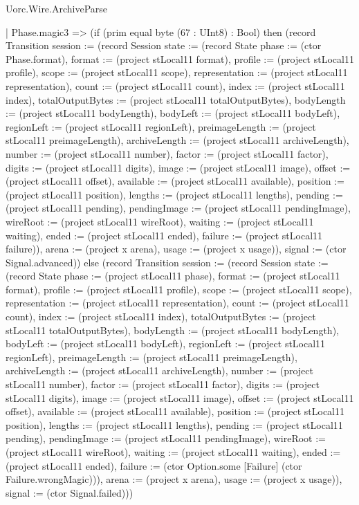 \begin{lexlean}{Uorc.Wire.ArchiveParse}
\begin{semanticmodule}
{    | Phase.magic3 => (if (prim equal byte (67 : UInt8) : Bool) then (record Transition {session := (record Session {state := (record State {phase := (ctor Phase.format), format := (project stLocal11 format), profile := (project stLocal11 profile), scope := (project stLocal11 scope), representation := (project stLocal11 representation), count := (project stLocal11 count), index := (project stLocal11 index), totalOutputBytes := (project stLocal11 totalOutputBytes), bodyLength := (project stLocal11 bodyLength), bodyLeft := (project stLocal11 bodyLeft), regionLeft := (project stLocal11 regionLeft), preimageLength := (project stLocal11 preimageLength), archiveLength := (project stLocal11 archiveLength), number := (project stLocal11 number), factor := (project stLocal11 factor), digits := (project stLocal11 digits), image := (project stLocal11 image), offset := (project stLocal11 offset), available := (project stLocal11 available), position := (project stLocal11 position), lengths := (project stLocal11 lengths), pending := (project stLocal11 pending), pendingImage := (project stLocal11 pendingImage), wireRoot := (project stLocal11 wireRoot), waiting := (project stLocal11 waiting), ended := (project stLocal11 ended), failure := (project stLocal11 failure)}), arena := (project x arena), usage := (project x usage)}), signal := (ctor Signal.advanced)}) else (record Transition {session := (record Session {state := (record State {phase := (project stLocal11 phase), format := (project stLocal11 format), profile := (project stLocal11 profile), scope := (project stLocal11 scope), representation := (project stLocal11 representation), count := (project stLocal11 count), index := (project stLocal11 index), totalOutputBytes := (project stLocal11 totalOutputBytes), bodyLength := (project stLocal11 bodyLength), bodyLeft := (project stLocal11 bodyLeft), regionLeft := (project stLocal11 regionLeft), preimageLength := (project stLocal11 preimageLength), archiveLength := (project stLocal11 archiveLength), number := (project stLocal11 number), factor := (project stLocal11 factor), digits := (project stLocal11 digits), image := (project stLocal11 image), offset := (project stLocal11 offset), available := (project stLocal11 available), position := (project stLocal11 position), lengths := (project stLocal11 lengths), pending := (project stLocal11 pending), pendingImage := (project stLocal11 pendingImage), wireRoot := (project stLocal11 wireRoot), waiting := (project stLocal11 waiting), ended := (project stLocal11 ended), failure := (ctor Option.some [Failure] (ctor Failure.wrongMagic))}), arena := (project x arena), usage := (project x usage)}), signal := (ctor Signal.failed)}))
}
\end{semanticmodule}
\end{lexlean}
